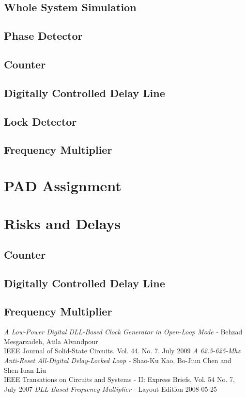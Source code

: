 \documentclass[a4paper,12pt]{article} \usepackage{graphicx}
\begin{document}
\subsection{Whole System Simulation}
\subsection{Phase Detector}
\subsection{Counter}
\subsection{Digitally Controlled Delay Line}
\subsection{Lock Detector}
\subsection{Frequency Multiplier}
\section{PAD Assignment} %
\section{Risks and Delays}
\subsection{Counter}
\subsection{Digitally Controlled Delay Line}
\subsection{Frequency Multiplier}
\newpage 
\appendix 
\newpage

\begin{thebibliography}{99}
        \textit{A Low-Power Digital DLL-Based Clock Generator in Open-Loop Mode - }
                Behzad Mesgarzadeh, Atila Alvandpour \\
                IEEE Journal of Solid-State Circuits. Vol. 44. No. 7. July 2009
        \textit{A 62.5-625-Mhz Anti-Reset All-Digital Delay-Locked Loop - }
                Shao-Ku Kao, Bo-Jiun Chen and Shen-Iuan Liu \\
                IEEE Transations on Circuits and Systems - II: Express Briefs, Vol. 54 No. 7, July 2007
        \textit{DLL-Based Frequency Multiplier - }
                Layout Edition 2008-05-25 

\end{thebibliography}
\end{document}
